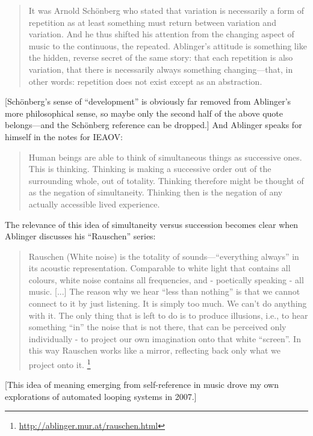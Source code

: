 \documentclass{thesis}
\begin{document}
	\begin{quote}
	It was Arnold Sch\"onberg who stated that variation is necessarily a form of repetition as at least something must return between variation and variation. And he thus shifted his attention from the changing aspect of music to the continuous, the repeated. Ablinger's attitude is something like the hidden, reverse secret of the same story: that each repetition is also variation, that there is necessarily always something changing---that, in other words: repetition does not exist except as an abstraction. 
	\end{quote}
	
	[Sch\"onberg's sense of ``development'' is obviously far removed from Ablinger's more philosophical sense, so maybe only the second half of the above quote belongs---and the Sch\"onberg reference can be dropped.]	And Ablinger speaks for himself in the notes for IEAOV:
	
	\begin{quote}
	Human beings are able to think of simultaneous things as successive ones. This is thinking. Thinking is making a successive order out of the surrounding whole, out of totality. Thinking therefore might be thought of as the negation of simultaneity. Thinking then is the negation of any actually accessible lived experience.
	\end{quote}
	
	The relevance of this idea of simultaneity versus succession becomes clear when Ablinger discusses his ``Rauschen'' series:
	
	\begin{quote}
	Rauschen (White noise) is the totality of sounds---``everything always'' in its acoustic representation. Comparable to white light that contains all colours, white noise contains all frequencies, and - poetically speaking - all music. [...] The reason why we hear ``less than nothing'' is that we cannot connect to it by just listening. It is simply too much. We can't do anything with it. The only thing that is left to do is to produce illusions, i.e., to hear something ``in'' the noise that is not there, that can be perceived only individually - to project our own imagination onto that white ``screen''. In this way Rauschen works like a mirror, reflecting back only what we project onto it. \footnote{\url{http://ablinger.mur.at/rauschen.html}}
	\end{quote}

	[This idea of meaning emerging from self-reference in music drove my own explorations of automated looping systems in 2007.]
	
\end{document}

